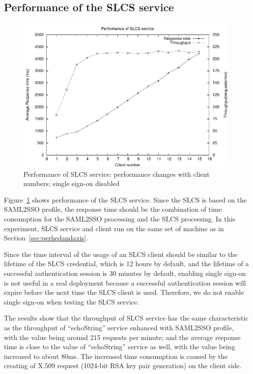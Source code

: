 \documentclass[conference]{IEEEtran}
\begin{document}
\subsection{Performance of the SLCS service}
\label{sec:perfslcsserv}

\begin{figure}
\includegraphics[width=0.9\columnwidth]{SLCS_thread_all.pdf}
\caption{Performance of SLCS service: performance changes with client numbers; single sign-on disabled}
\label{fig:SLCS_thread_all}
\end{figure}

Figure~\ref{fig:SLCS_thread_all} shows performance of the SLCS service.
Since the SLCS is based on the SAML2SSO profile, the response time should be the combination of
time consumption for the SAML2SSO processing and the SLCS processing. In this experiment, SLCS
service and client run on the same set of machine as in Section~\ref{sec:perhedandaxis}. 

Since the time interval of the usage of an SLCS client should be similar to the lifetime of the SLCS
credential, which is 12 hours by default, and the lifetime of a successful authentication session is 
30 minutes by default, enabling single sign-on is not useful in a real deployment because a successful 
authentication session will expire before the next time the SLCS client is used. Therefore, 
we do not enable single sign-on when testing the SLCS service.

The results show that the throughput of SLCS service has the same characteristic
as the throughput of ``echoString'' service enhanced with SAML2SSO profile, with the value being
around 215 requests per minute; and the average response time is close to the value of
``echoString'' service as well, with the value being increased to about 80ms. The increased time
consumption is caused by the creating of X.509 request (1024-bit RSA key pair generation) on the client
side.
\end{document}
